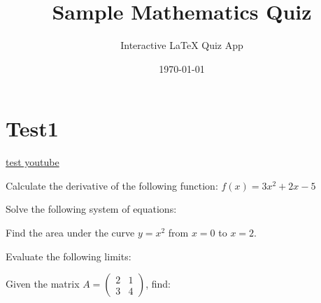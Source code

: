 \documentclass[12pt]{exam}
\title{Sample Mathematics Quiz}
\author{Interactive LaTeX Quiz App}
\date{\today}
\begin{document}
\maketitle


\section{Test1}
\href{https://www.youtube.com/watch?v=spUNpyF58BY&t=523s}{test youtube}
\begin{questions}

\question Calculate the derivative of the following function: $f(x) = 3x^2 + 2x - 5$

\question Solve the following system of equations:

\question Find the area under the curve $y = x^2$ from $x = 0$ to $x = 2$.

\question Evaluate the following limits:

\question Given the matrix $A = \begin{pmatrix} 2 & 1 \\ 3 & 4 \end{pmatrix}$, find:
\end{questions}
\end{document}
